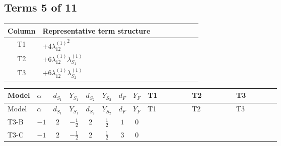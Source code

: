 \documentclass[8pt]{article}
\begin{document}
\begin{landscape}
\subsection*{Terms 5 of 11}
\begin{center}
\begin{tabular}{@{}c >{\raggedright\arraybackslash}p{0.82\linewidth}@{}}
\toprule
Column & Representative term structure \\
\midrule
T1 & \(\displaystyle +4 {\lambda_{12}^{(1)}}^2\) \\
\midrule
T2 & \(\displaystyle +6 {\lambda_{12}^{(1)}} {\lambda_{S_1}^{(1)}}\) \\
\midrule
T3 & \(\displaystyle +6 {\lambda_{12}^{(1)}} {\lambda_{S_2}^{(1)}}\) \\
\midrule
\bottomrule
\end{tabular}
\end{center}
\smallskip
\tiny
\begin{longtable}{@{}llcccccc >{\raggedright\arraybackslash}p{0.21\linewidth} >{\raggedright\arraybackslash}p{0.21\linewidth} >{\raggedright\arraybackslash}p{0.21\linewidth}@{}}
\toprule
Model & $\alpha$ & $d_{S_1}$ & $Y_{S_1}$ & $d_{S_2}$ & $Y_{S_2}$ & $d_F$ & $Y_F$ & T1 & T2 & T3 \\
\midrule
\endfirsthead
\toprule
Model & $\alpha$ & $d_{S_1}$ & $Y_{S_1}$ & $d_{S_2}$ & $Y_{S_2}$ & $d_F$ & $Y_F$ & T1 & T2 & T3 \\
\midrule
\endhead
T3-B & $-1$ & $2$ & $-\frac{1}{2}$ & $2$ & $\frac{1}{2}$ & $1$ & $0$ & \scriptsize\adjustbox{max width=\linewidth}{$\begin{gathered} +4 {\lambda_{12}^{(1)}}^2\end{gathered}$} & \scriptsize\adjustbox{max width=\linewidth}{$\begin{gathered} +6 {\lambda_{12}^{(1)}} {\lambda_{S_1}^{(1)}}\end{gathered}$} & \scriptsize\adjustbox{max width=\linewidth}{$\begin{gathered} +6 {\lambda_{12}^{(1)}} {\lambda_{S_2}^{(1)}}\end{gathered}$} \\
\midrule
T3-C & $-1$ & $2$ & $-\frac{1}{2}$ & $2$ & $\frac{1}{2}$ & $3$ & $0$ & \scriptsize\adjustbox{max width=\linewidth}{$\begin{gathered} +4 {\lambda_{12}^{(1)}}^2\end{gathered}$} & \scriptsize\adjustbox{max width=\linewidth}{$\begin{gathered} +6 {\lambda_{12}^{(1)}} {\lambda_{S_1}^{(1)}}\end{gathered}$} & \scriptsize\adjustbox{max width=\linewidth}{$\begin{gathered} +6 {\lambda_{12}^{(1)}} {\lambda_{S_2}^{(1)}}\end{gathered}$} \\

\end{longtable}
\end{landscape}
\end{document}
